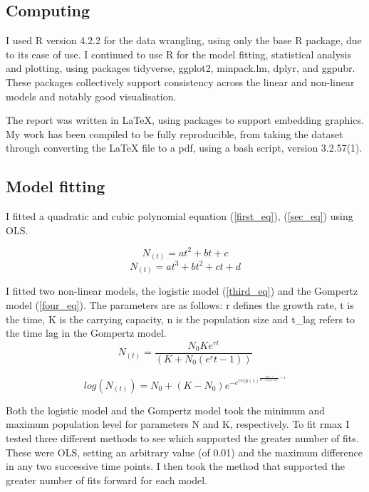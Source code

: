 \documentclass[11pt]{article}
\begin{document}
\subsection{Computing}
I used R version 4.2.2 for the data wrangling, using only the base R package, due to its ease of use. I continued to use R for the model fitting, statistical analysis and plotting, using packages tidyverse, ggplot2, minpack.lm, dplyr, and ggpubr. These packages collectively support consistency across the linear and non-linear models and notably good visualisation.  

The report was written in \LaTeX, using packages to support embedding graphics. My work has been compiled to be fully reproducible, from taking the dataset through converting the LaTeX file to a pdf, using a bash script, version 3.2.57(1). 

\subsection{Model fitting}
I fitted a quadratic and cubic polynomial equation (\ref{first_eq}), (\ref{sec_eq}) using OLS. 

\begin{equation}\label{first_eq}
    N_{(t)} = at^2 + bt + c
\end{equation}
\begin{equation}\label{sec_eq}
   N_{(t)} = at^3 + bt^2 + ct + d
\end{equation}


I fitted two non-linear models, the logistic model (\ref{third_eq}) and the Gompertz model (\ref{four_eq}). The parameters are as follows: r defines the growth rate, t is the time, K is the carrying capacity, n is the population size and t\_lag refers to the time lag in the Gompertz model. 
\begin{equation}\label{third_eq}
    N_{(t)} = \frac {N_0Ke^{rt}}{(K + N_0(e^rt{} - 1))}
\end{equation}

\begin{equation}\label{four_eq}
   log (N_{(t)}) = N_0 + (K - N_0)e^{-e^{r exp(1)^{\frac{t_lag - t}{K - N_0 log(10)} + 1}}}
\end{equation}

Both the logistic model and the Gompertz model took the minimum and maximum population level for parameters N and K, respectively.  To fit r\textunderscore max I tested three different methods to see which supported the greater number of fits. These were OLS, setting an arbitrary value (of 0.01) and the maximum difference in any two successive time points. I then took the method that supported the greater number of fits forward for each model. 
\end{document}
